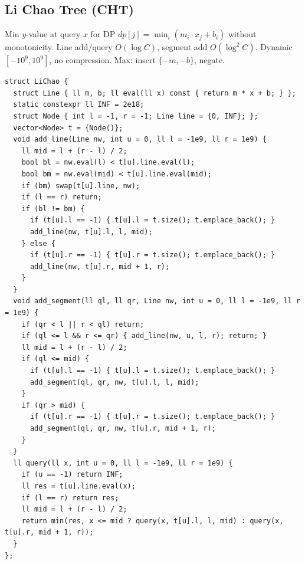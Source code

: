 \subsection{Li Chao Tree (CHT)}
Min $y$-value at query $x$ for DP $dp[j]=\min_i(m_i\cdot x_j+b_i)$ without monotonicity. Line add/query $O(\log C)$, segment add $O(\log^2 C)$. Dynamic $[-10^9,10^9]$, no compression. Max: insert $\{-m,-b\}$, negate.
\begin{verbatim}
struct LiChao {
  struct Line { ll m, b; ll eval(ll x) const { return m * x + b; } };
  static constexpr ll INF = 2e18;
  struct Node { int l = -1, r = -1; Line line = {0, INF}; };
  vector<Node> t = {Node()};
  void add_line(Line nw, int u = 0, ll l = -1e9, ll r = 1e9) {
    ll mid = l + (r - l) / 2;
    bool bl = nw.eval(l) < t[u].line.eval(l);
    bool bm = nw.eval(mid) < t[u].line.eval(mid);
    if (bm) swap(t[u].line, nw);
    if (l == r) return;
    if (bl != bm) {
      if (t[u].l == -1) { t[u].l = t.size(); t.emplace_back(); }
      add_line(nw, t[u].l, l, mid);
    } else {
      if (t[u].r == -1) { t[u].r = t.size(); t.emplace_back(); }
      add_line(nw, t[u].r, mid + 1, r);
    }
  }
  void add_segment(ll ql, ll qr, Line nw, int u = 0, ll l = -1e9, ll r = 1e9) {
    if (qr < l || r < ql) return;
    if (ql <= l && r <= qr) { add_line(nw, u, l, r); return; }
    ll mid = l + (r - l) / 2;
    if (ql <= mid) {
      if (t[u].l == -1) { t[u].l = t.size(); t.emplace_back(); }
      add_segment(ql, qr, nw, t[u].l, l, mid);
    }
    if (qr > mid) {
      if (t[u].r == -1) { t[u].r = t.size(); t.emplace_back(); }
      add_segment(ql, qr, nw, t[u].r, mid + 1, r);
    }
  }
  ll query(ll x, int u = 0, ll l = -1e9, ll r = 1e9) {
    if (u == -1) return INF;
    ll res = t[u].line.eval(x);
    if (l == r) return res;
    ll mid = l + (r - l) / 2;
    return min(res, x <= mid ? query(x, t[u].l, l, mid) : query(x, t[u].r, mid + 1, r));
  }
};
\end{verbatim}
